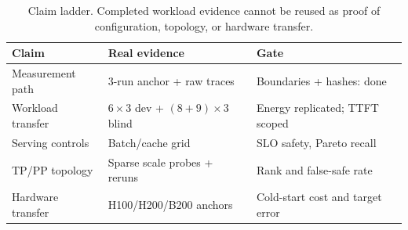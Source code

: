 \begin{table}[t]
\centering
\caption{Claim ladder.  Completed workload evidence cannot be reused as proof
of configuration, topology, or hardware transfer.}
\label{tab:roadmap}
\scriptsize
\setlength{\tabcolsep}{2.6pt}
\begin{tabular}{@{}p{}p{}p{}@{}}
\toprule
Claim & Real evidence & Gate \\
\midrule
Measurement path & 3-run anchor + raw traces & Boundaries + hashes: done \\
Workload transfer & $6\!\times\!3$ dev + $(8+9)\!\times\!3$ blind & Energy replicated; TTFT scoped \\
Serving controls & Batch/cache grid & SLO safety, Pareto recall \\
TP/PP topology & Sparse scale probes + reruns & Rank and false-safe rate \\
Hardware transfer & H100/H200/B200 anchors & Cold-start cost and target error \\
\bottomrule
\end{tabular}
\end{table}
